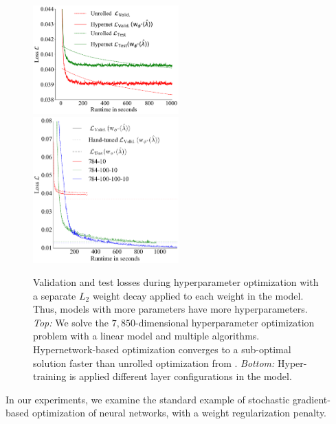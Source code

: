 \documentclass{article} %
\newcommand{\param}{\mathrm{w}} %
\newcommand{\curRename}[1]{\smash{\hat{#1}}} %
\begin{document}
\begin{figure}[ht!]
\centering
\includegraphics[width=0.5\textwidth]{hypernets_local_large.pdf}
\includegraphics[width=0.5\textwidth]{compare_number_layers.png}
\caption{
Validation and test losses during hyperparameter optimization with a separate $L_{2}$ weight decay applied to each weight in the model.
Thus, models with more parameters have more hyperparameters.
\emph{Top:} We solve the $7,850$-dimensional hyperparameter optimization problem with a linear model and multiple algorithms.
Hypernetwork-based optimization converges to a sub-optimal solution faster than unrolled optimization from \citet{maclaurin2015gradient}.
\emph{Bottom:} Hyper-training is applied different layer configurations in the model.
\label{fig:exp3}
}
\end{figure}
%
In our experiments, we examine the standard example of stochastic gradient-based optimization of neural networks, with a weight regularization penalty.
\end{document}
